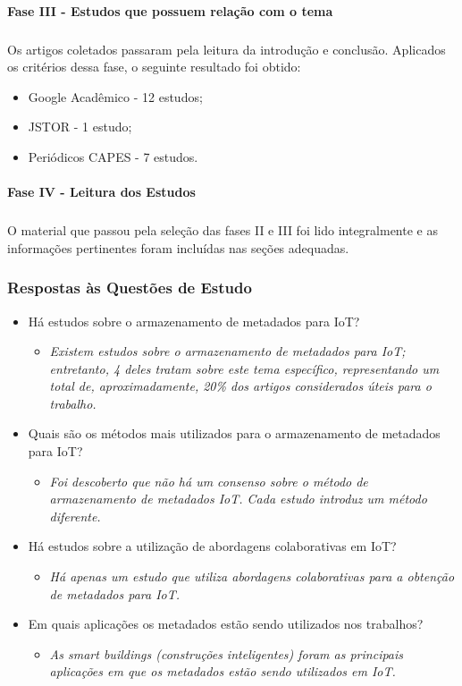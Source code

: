 \paragraph{Fase III - Estudos que possuem relação com o tema}
\subparagraph{}
\quad Os artigos coletados passaram pela leitura da introdução e conclusão.
Aplicados os critérios dessa fase, o seguinte resultado foi obtido:
\begin{itemize}
  \item Google Acadêmico - 12 estudos;
  \item JSTOR - 1 estudo;
  \item Periódicos CAPES - 7 estudos.
\end{itemize}
\paragraph{Fase IV - Leitura dos Estudos}
\subparagraph{}
\quad O material que passou pela seleção das fases II e III foi lido integralmente e as
informações pertinentes foram incluídas nas seções adequadas.
\subsubsection{Respostas às Questões de Estudo}
\begin{itemize}
  \item Há estudos sobre o armazenamento de metadados para \acrlong{IoT}?
 \begin{itemize}
    \item \textit{Existem estudos sobre o armazenamento de metadados para \acrshort{IoT}; entretanto, 4 deles tratam
    sobre este tema específico, representando um total de, aproximadamente, 20\% dos artigos considerados úteis para o trabalho.}
  \end{itemize}
  \item Quais são os métodos mais utilizados para o armazenamento de metadados para \acrshort{IoT}?
    \begin{itemize}
    \item \textit{Foi descoberto que não há um consenso sobre o método de armazenamento de metadados \acrshort{IoT}. Cada estudo introduz um método diferente.}
  \end{itemize}
  \item Há estudos sobre a utilização de abordagens colaborativas em \acrlong{IoT}?
  \begin{itemize}
    \item \textit{Há apenas um estudo que utiliza abordagens colaborativas para a obtenção de metadados para \acrshort{IoT}.}
  \end{itemize}
  \item Em quais aplicações os metadados estão sendo utilizados nos trabalhos?
  \begin{itemize}
    \item \textit{As smart buildings (construções inteligentes) foram as principais aplicações em que os metadados estão sendo utilizados em \acrshort{IoT}.}
  \end{itemize}
\end{itemize}


